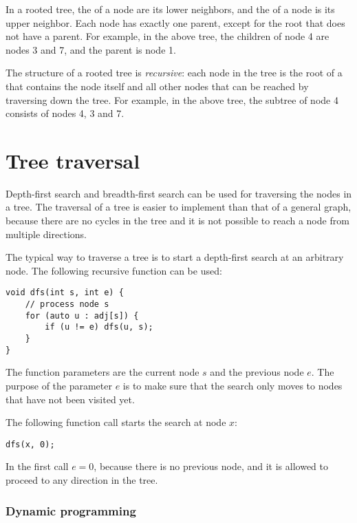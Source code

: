 
In a rooted tree, the  of a node
are its lower neighbors, and the  of a node
is its upper neighbor.
Each node has exactly one parent,
except for the root that does not have a parent.
For example, in the above tree,
the children of node 4 are nodes 3 and 7,
and the parent is node 1.


The structure of a rooted tree is \emph{recursive}:
each node in the tree is the root of a 
that contains the node itself and all other nodes
that can be reached by traversing down the tree.
For example, in the above tree, the subtree of node 4
consists of nodes 4, 3 and 7.

\section{Tree traversal}

Depth-first search and breadth-first search
can be used for traversing the nodes in a tree.
The traversal of a tree is easier to implement than
that of a general graph, because
there are no cycles in the tree and it is not
possible to reach a node from multiple directions.

The typical way to traverse a tree is to start
a depth-first search at an arbitrary node.
The following recursive function can be used:

\begin{lstlisting}
void dfs(int s, int e) {
    // process node s
    for (auto u : adj[s]) {
        if (u != e) dfs(u, s);
    }
}
\end{lstlisting}

The function parameters are the current node $s$
and the previous node $e$.
The purpose of the parameter $e$ is to make sure
that the search only moves to nodes
that have not been visited yet.

The following function call starts the search
at node $x$:

\begin{lstlisting}
dfs(x, 0);
\end{lstlisting}

In the first call $e=0$, because there is no
previous node, and it is allowed
to proceed to any direction in the tree.

\subsubsection{Dynamic programming}

